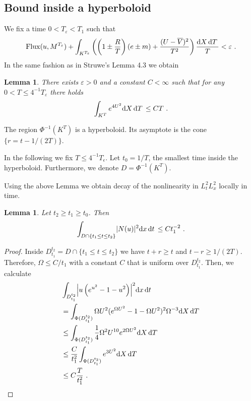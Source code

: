 \documentclass[a4paper]{amsart}
\newtheorem{lemma}[thm]{Lemma}
\providecommand{\dint}[1]{ {\rm d} #1\,}
\begin{document}
\subsection{Bound inside a hyperboloid}

We fix a time $0 < T_\varepsilon < T_1$ such that
\begin{equation*}
  \operatorname{Flux}(u,M^{T_\varepsilon})
  +
  \int_{K^{T_\varepsilon}}
  \left( 
  \left( 
  1 \pm \frac{R}{T}
  \right)
  \left( 
  e \pm m
  \right)
  +
  \frac{(U - \overline{V})^2}{T^2}
  \right)
  \frac{\dint{X} \dint{T}}{T}
  <
  \varepsilon \ .
\end{equation*}
In the same fashion as in Struwe's Lemma 4.3 we obtain
\begin{lemma}
  There exists $\varepsilon > 0$ and a constant $C < \infty$ such that
  for any $0 < T \leq 4^{-1} T_\varepsilon$ there holds
  \begin{equation*}
    \int_{K^T}
    e^{4 U^2}
    \dint{X} \dint{T}
    \leq
    C T \ .
  \end{equation*}
  \label{lem:nonlineartermisboundedonsmallcones}
\end{lemma}
The region $\Phi^{-1}(K^T)$ is a hyperboloid. Its asymptote is the cone
$\{r = t - 1 / (2 T)\}$.
\par
In the following we fix $T \leq 4^{-1} T_\epsilon$. Let $t_0 = 1 / T$,
the smallest time inside the hyperboloid. 
Furthermore, we denote $D = \Phi^{-1}(K^T)$.
\par
Using the above Lemma we obtain decay of the nonlinearity in $L^2_t
L^2_x$ locally in time.
\begin{lemma}
  Let $t_2 \geq t_1 \geq t_0$. Then
  \begin{equation*}
    \int_{D \cap \{t_1 \leq t \leq t_2\}}
    \lvert N(u) \rvert^2
    \dint{x} \dint{t}
    \leq
    C t_1^{-2}
    \ .
  \end{equation*}
  \label{lem:locall2l2bound}
\end{lemma}
\begin{proof}
  Inside $D_{t_1}^{t_2} = D \cap \{t_1 \leq t \leq t_2\}$ we have $t +
  r \geq t$ and $t - r \geq 1 / (2 T)$. Therefore, $\Omega \leq C / t_1$
  with a constant $C$ that is uniform over $D_{t_1}^{t_2}$.
  Then, we calculate
  \begin{equation*}
    \begin{split}
      &\int_{D_{t_1}^{t_2}}
      \Bigl|
      u
      \left(
      e^{u^2} - 1 - u^2
      \right)
      \Bigr|^2
      \dint{x} \dint{t} \\
      &=
      \int_{\Phi(D_{t_1}^{t_2})}
      \Omega U^2
      (e^{\Omega U^2} - 1 - \Omega U^2)^2
      \Omega^{-3}
      \dint{X} \dint{T} \\
      &\leq
      \int_{\Phi(D_{t_1}^{t_2})}
      \frac{1}{4}
      \Omega^2 U^{10} e^{2 \Omega U^2}
      \dint{X} \dint{T}
      \\
      &\leq
      \frac{C}{t_1^2}
      \int_{\Phi(D_{t_1}^{t_2})}
      e^{3 U^2}
      \dint{X} \dint{T}
      \\
      &\leq
      C \frac{T}{t_1^2}
      \ .
    \end{split}
  \end{equation*}
\end{proof}
\end{document}
